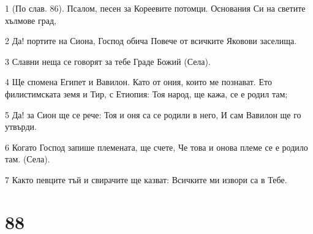 \par 1 (По слав. 86). Псалом, песен за Кореевите потомци. Основания Си на светите хълмове град,
\par 2 Да! портите на Сиона, Господ обича Повече от всичките Яковови заселища.
\par 3 Славни неща се говорят за тебе Граде Божий (Села).
\par 4 Ще спомена Египет и Вавилон. Като от ония, които ме познават. Ето филистимската земя и Тир, с Етиопия: Тоя народ, ще кажа, се е родил там;
\par 5 Да! за Сион ще се рече: Тоя и оня са се родили в него, И сам Вавилон ще го утвърди.
\par 6 Когато Господ запише племената, ще счете, Че това и онова племе се е родило там. (Села).
\par 7 Както певците тъй и свирачите ще казват: Всичките ми извори са в Тебе.

\chapter{88}

